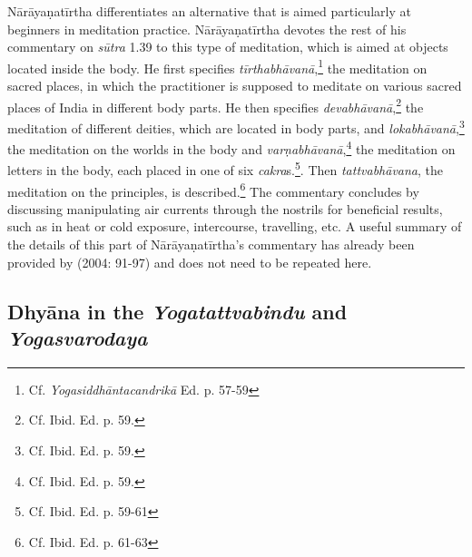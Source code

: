 Nārāyaṇatīrtha differentiates an alternative that is aimed particularly at beginners in meditation practice. Nārāyaṇatīrtha devotes the rest of his commentary on \textit{sūtra} 1.39 to this type of meditation, which is aimed at objects located inside the body. He first specifies \textit{tīrthabhāvanā},\footnote{Cf. \emph{Yogasiddhāntacandrikā} Ed. p. 57-59} the meditation on sacred places, in which the practitioner is supposed to meditate on various sacred places of India in different body parts. He then specifies \textit{devabhāvanā},\footnote{Cf. Ibid. Ed. p. 59.} the meditation of different deities, which are located in body parts, and \textit{lokabhāvanā},\footnote{Cf. Ibid. Ed. p. 59.} the meditation on the worlds in the body and \textit{varṇabhāvanā},\footnote{Cf. Ibid. Ed. p. 59.} the meditation on letters in the body, each placed in one of six \textit{cakra}s.\footnote{Cf. Ibid. Ed. p. 59-61}. Then \textit{tattvabhāvana}, the meditation on the principles, is described.\footnote{Cf. Ibid. Ed. p. 61-63} The commentary concludes by discussing manipulating air currents through the nostrils for beneficial results, such as in heat or cold exposure, intercourse, travelling, etc. A useful summary of the details of this part of Nārāyaṇatīrtha's commentary has already been provided by \citeauthor{penna} (2004: 91-97) and does not need to be repeated here.

\subsection{Dhyāna in the \textit{Yogatattvabindu} and \textit{Yogasvarodaya}}

